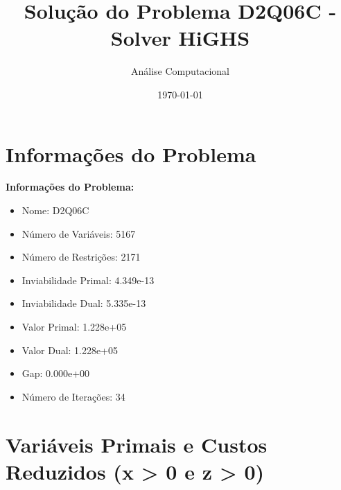 \documentclass[12pt]{article}
\title{Solução do Problema D2Q06C - Solver HiGHS}
\author{Análise Computacional}
\date{\today}
\begin{document}
\maketitle

\section{Informações do Problema}

\textbf{Informações do Problema:}
\begin{itemize}
\item Nome: D2Q06C
\item Número de Variáveis: 5167
\item Número de Restrições: 2171
\item Inviabilidade Primal: 4.349e-13
\item Inviabilidade Dual: 5.335e-13
\item Valor Primal: 1.228e+05
\item Valor Dual: 1.228e+05
\item Gap: 0.000e+00
\item Número de Iterações: 34
\end{itemize}


\section{Variáveis Primais e Custos Reduzidos (x > 0 e z > 0)}
\end{document}
